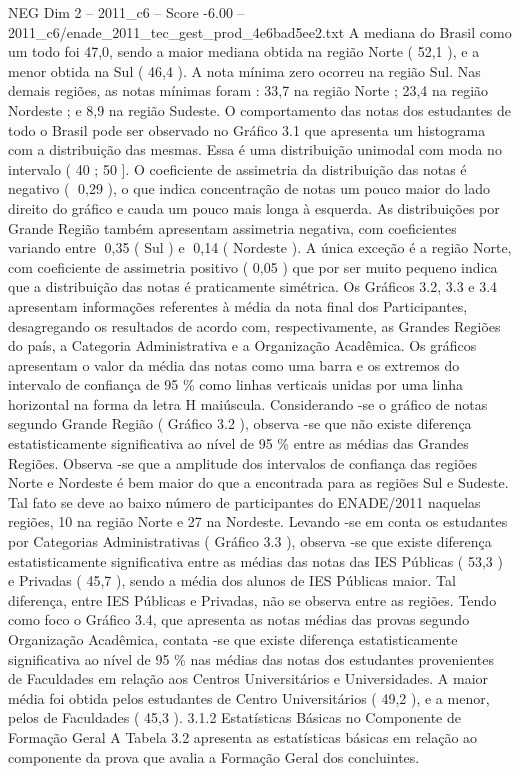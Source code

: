 \begin{textsample}{NEG Dim 2 – 2011\_c6 – Score -6.00 – 2011\_c6/enade\_2011\_tec\_gest\_prod\_4e6bad5ee2.txt}
A mediana do Brasil como um todo foi 47,0, sendo a maior mediana obtida na região Norte ( 52,1 ), e a menor obtida na Sul ( 46,4 ).
A nota mínima zero ocorreu na região Sul.
Nas demais regiões, as notas mínimas foram : 33,7 na região Norte ; 23,4 na região Nordeste ; e 8,9 na região Sudeste.
O comportamento das notas dos estudantes de todo o Brasil pode ser observado no Gráfico 3.1 que apresenta um histograma com a distribuição das mesmas.
Essa é uma distribuição unimodal com moda no intervalo ( 40 ; 50 ].
O coeficiente de assimetria da distribuição das notas é negativo ( 0,29 ), o que indica concentração de notas um pouco maior do lado direito do gráfico e cauda um pouco mais longa à esquerda.
As distribuições por Grande Região também apresentam assimetria negativa, com coeficientes variando entre 0,35 ( Sul ) e 0,14 ( Nordeste ).
A única exceção é a região Norte, com coeficiente de assimetria positivo ( 0,05 ) que por ser muito pequeno indica que a distribuição das notas é praticamente simétrica.
Os Gráficos 3.2, 3.3 e 3.4 apresentam informações referentes à média da nota final dos Participantes, desagregando os resultados de acordo com, respectivamente, as Grandes Regiões do país, a Categoria Administrativa e a Organização Acadêmica.
Os gráficos apresentam o valor da média das notas como uma barra e os extremos do intervalo de confiança de 95 \% como linhas verticais unidas por uma linha horizontal na forma da letra H maiúscula.
Considerando -se o gráfico de notas segundo Grande Região ( Gráfico 3.2 ), observa -se que não existe diferença estatisticamente significativa ao nível de 95 \% entre as médias das Grandes Regiões.
Observa -se que a amplitude dos intervalos de confiança das regiões Norte e Nordeste é bem maior do que a encontrada para as regiões Sul e Sudeste.
Tal fato se deve ao baixo número de participantes do ENADE/2011 naquelas regiões, 10 na região Norte e 27 na Nordeste.
Levando -se em conta os estudantes por Categorias Administrativas ( Gráfico 3.3 ), observa -se que existe diferença estatisticamente significativa entre as médias das notas das IES Públicas ( 53,3 ) e Privadas ( 45,7 ), sendo a média dos alunos de IES Públicas maior.
Tal diferença, entre IES Públicas e Privadas, não se observa entre as regiões.
Tendo como foco o Gráfico 3.4, que apresenta as notas médias das provas segundo Organização Acadêmica, contata -se que existe diferença estatisticamente significativa ao nível de 95 \% nas médias das notas dos estudantes provenientes de Faculdades em relação aos Centros Universitários e Universidades.
A maior média foi obtida pelos estudantes de Centro Universitários ( 49,2 ), e a menor, pelos de Faculdades ( 45,3 ). 3.1.2 Estatísticas Básicas no Componente de Formação Geral A Tabela 3.2 apresenta as estatísticas básicas em relação ao componente da prova que avalia a Formação Geral dos concluintes.

\end{textsample}
